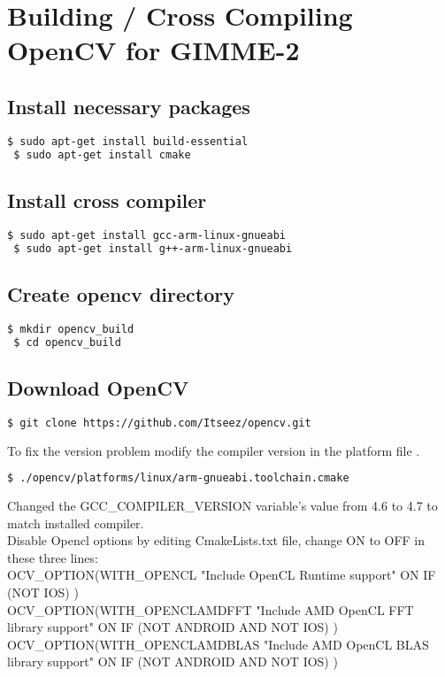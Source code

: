 \section{Building / Cross Compiling OpenCV for GIMME-2}
\label{OPENCV}
\subsection{Install necessary packages }
\begin{lstlisting}[language=bash]
 $ sudo apt-get install build-essential
 $ sudo apt-get install cmake
\end{lstlisting}
\subsection{Install  cross compiler }
\begin{lstlisting}[language=bash]
 $ sudo apt-get install gcc-arm-linux-gnueabi 
 $ sudo apt-get install g++-arm-linux-gnueabi
\end{lstlisting}
\subsection{Create opencv directory }
\begin{lstlisting}[language=bash]
 $ mkdir opencv_build
 $ cd opencv_build
\end{lstlisting}
\subsection{Download OpenCV}
\begin{lstlisting}[language=bash]
  $ git clone https://github.com/Itseez/opencv.git
\end{lstlisting}
To fix the version problem modify the compiler version in the platform file .
\begin{lstlisting}[language=bash]
 $ ./opencv/platforms/linux/arm-gnueabi.toolchain.cmake
 \end{lstlisting}
Changed the GCC\_COMPILER\_VERSION variable’s value from 4.6 to 4.7 to match installed compiler.\\
Disable Opencl options by editing CmakeLists.txt  file, change ON to OFF in these three lines:\\
OCV\_OPTION(WITH\_OPENCL  "Include OpenCL Runtime support"   ON  IF (NOT IOS) )\\
OCV\_OPTION(WITH\_OPENCLAMDFFT   "Include AMD OpenCL FFT library support"  ON IF (NOT ANDROID AND NOT IOS) )\\
OCV\_OPTION(WITH\_OPENCLAMDBLAS  "Include AMD OpenCL BLAS library support" ON IF (NOT ANDROID AND NOT IOS) )

